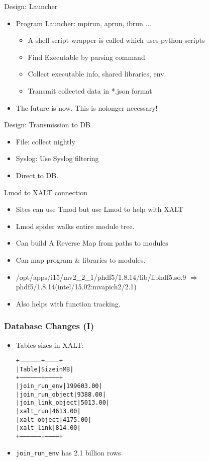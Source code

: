 \documentclass{beamer}
\begin{document}
\begin{frame}{Design: Launcher}
  \begin{itemize}
    \item Program Launcher: mpirun, aprun, ibrun ...
      \begin{itemize}
        \item A shell script wrapper is called which uses python scripts
        \item Find Executable by parsing command
        \item Collect executable info, shared libraries, env.
        \item Transmit collected data in *.json format
      \end{itemize}
    \item The future is now.  This is nolonger necessary!
  \end{itemize}
\end{frame}

\begin{frame}{Design: Transmission to DB}
  \begin{itemize}
    \item File: collect nightly
    \item Syslog: Use Syslog filtering
    \item Direct to DB.
  \end{itemize}
\end{frame}

\begin{frame}{Lmod to XALT connection}
  \begin{itemize}
    \item Sites can use Tmod but use Lmod to help with XALT
    \item Lmod spider walks entire module tree.
    \item Can build A Reverse Map from paths to modules
    \item Can map program \& libraries to modules.
    \item /opt/apps/i15/mv2\_2\_1/phdf5/1.8.14/lib/libhdf5.so.9
      $\Rightarrow$ phdf5/1.8.14(intel/15.02:mvapich2/2.1)
    \item Also helps with function tracking.
  \end{itemize}
\end{frame}

\begin{frame}[fragile]
    \frametitle{Database Changes (I)}
  \begin{itemize}
      \item Tables sizes in XALT:
 {\small
    \begin{alltt}
+------------------+------------+
| Table            | Size in MB |
+------------------+------------+
| join_run_env     |  199603.00 |
| join_run_object  |    9388.00 |
| join_link_object |    5013.00 |
| xalt_run         |    4613.00 |
| xalt_object      |    4175.00 |
| xalt_link        |     814.00 |
+------------------+------------+
    \end{alltt}
}
    \item \texttt{join\_run\_env} has 2.1 billion rows
  \end{itemize}
\end{frame}
\end{document}
